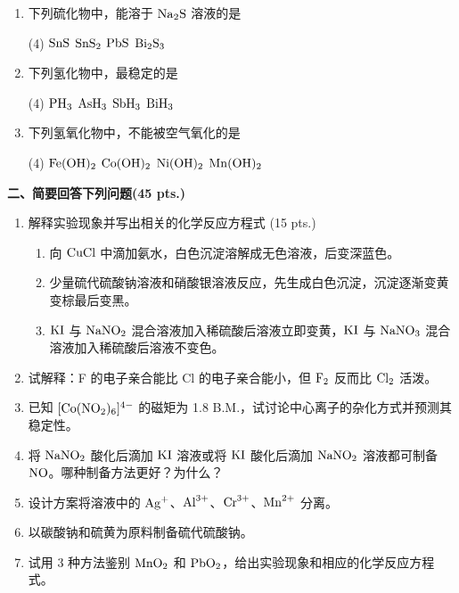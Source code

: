 \begin{enumerate}[label=\arabic*., itemsep=1.5ex]
    \item 下列硫化物中，能溶于 $\ce{Na2S}$ 溶液的是
    \begin{tasks}(4)
        \task $\ce{SnS}$
        \task $\ce{SnS2}$
        \task $\ce{PbS}$
        \task $\ce{Bi2S3}$
    \end{tasks}

    \item 下列氢化物中，最稳定的是
    \begin{tasks}(4)
        \task $\ce{PH3}$
        \task $\ce{AsH3}$
        \task $\ce{SbH3}$
        \task $\ce{BiH3}$
    \end{tasks}

    \item 下列氢氧化物中，不能被空气氧化的是
    \begin{tasks}(4)
        \task $\ce{Fe(OH)2}$
        \task $\ce{Co(OH)2}$
        \task $\ce{Ni(OH)2}$
        \task $\ce{Mn(OH)2}$
    \end{tasks}
\end{enumerate}

\vspace{1em}
\noindent\textbf{二、简要回答下列问题(45 pts.)}

\begin{enumerate}[label=\arabic*., itemsep=1.5ex]
    \item 解释实验现象并写出相关的化学反应方程式 (15 pts.)
    \begin{enumerate}[label=(\arabic*), noitemsep, topsep=0pt, partopsep=0pt]
        \item 向 $\ce{CuCl}$ 中滴加氨水，白色沉淀溶解成无色溶液，后变深蓝色。
        \item 少量硫代硫酸钠溶液和硝酸银溶液反应，先生成白色沉淀，沉淀逐渐变黄变棕最后变黑。
        \item $\ce{KI}$ 与 $\ce{NaNO2}$ 混合溶液加入稀硫酸后溶液立即变黄，$\ce{KI}$ 与 $\ce{NaNO3}$ 混合溶液加入稀硫酸后溶液不变色。
    \end{enumerate}

    \item 试解释：F 的电子亲合能比 Cl 的电子亲合能小，但 $\ce{F2}$ 反而比 $\ce{Cl2}$ 活泼。

    \item 已知 $[\ce{Co(NO2)6}]^{4-}$ 的磁矩为 1.8 B.M.，试讨论中心离子的杂化方式并预测其稳定性。

    \item 将 $\ce{NaNO2}$ 酸化后滴加 $\ce{KI}$ 溶液或将 $\ce{KI}$ 酸化后滴加 $\ce{NaNO2}$ 溶液都可制备 $\ce{NO}$。哪种制备方法更好？为什么？

    \item 设计方案将溶液中的 $\ce{Ag+}$、$\ce{Al^{3+}}$、$\ce{Cr^{3+}}$、$\ce{Mn^{2+}}$ 分离。

    \item 以碳酸钠和硫黄为原料制备硫代硫酸钠。

    \item 试用 3 种方法鉴别 $\ce{MnO2}$ 和 $\ce{PbO2}$，给出实验现象和相应的化学反应方程式。
\end{enumerate}

